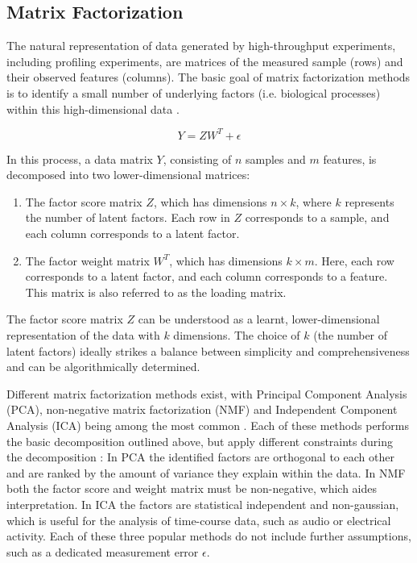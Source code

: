 \begin{flushleft}
\subsection{Matrix Factorization}
The natural representation of data generated by high-throughput experiments, including profiling experiments, are matrices of the measured sample (rows) and their observed features (columns). The basic goal of matrix factorization methods is to identify a small number of underlying factors (i.e. biological processes) within this high-dimensional data \parencite{stein-obrienEnterMatrixFactorization2018}. 

\begin{equation}
    Y = ZW^T + \epsilon
\end{equation}

In this process, a data matrix \( Y \), consisting of \( n \) samples and \( m \) features, is decomposed into two lower-dimensional matrices: 

\begin{enumerate}
    \item The factor score matrix \( Z \), which has dimensions \( n \times k \), where \( k \) represents the number of latent factors. Each row in \( Z \) corresponds to a sample, and each column corresponds to a latent factor.
    \item The factor weight matrix \( W^T \), which has dimensions \( k \times m \). Here, each row corresponds to a latent factor, and each column corresponds to a feature. This matrix is also referred to as the loading matrix. 
\end{enumerate}

The factor score matrix \( Z \) can be understood as a learnt, lower-dimensional representation of the data with \( k \) dimensions. The choice of \( k \) (the number of latent factors) ideally strikes a balance between simplicity and comprehensiveness and can be algorithmically determined. 

Different matrix factorization methods exist, with Principal Component Analysis (PCA), non-negative matrix factorization (NMF) and Independent Component Analysis (ICA) being among the most common \parencite{stein-obrienEnterMatrixFactorization2018}. Each of these methods performs the basic decomposition outlined above, but apply different constraints during the decomposition \parencite{stein-obrienEnterMatrixFactorization2018}: In PCA the identified factors are orthogonal to each other and are ranked by the amount of variance they explain within the data. In NMF both the factor score and weight matrix must be non-negative, which aides interpretation. In ICA the factors are statistical independent and non-gaussian, which is useful for the analysis of time-course data, such as audio or electrical activity. Each of these three popular methods do not include further assumptions, such as a dedicated measurement error \(\epsilon\).


\end{flushleft}
